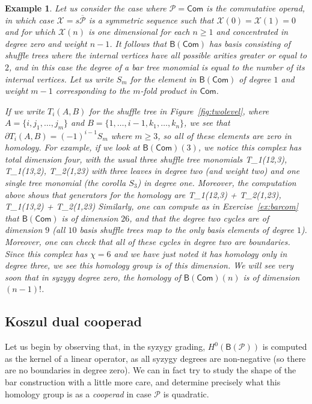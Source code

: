 \documentclass[fleqn, a4paper, twoside]{article}
\makeatletter
\newcommand{\0}{\langle 0\rangle}
\newcommand{\XX}{\mathcal{X}}
\newcommand{\B}[1]{\mathsf{B}(#1)}
\let\[\@undefined
\DeclareRobustCommand{\[}{\begin{equation}}%
\let\]\@undefined
\DeclareRobustCommand{\]}{\end{equation}}%
\theoremstyle{mytheorem}
\theoremstyle{introthm}
\theoremstyle{mydefinition}
\newtheorem{example}[theorem]{Example}
\theoremstyle{mydefinition2}
\theoremstyle{plain} %
\newcommand{\Com}{\mathsf{Com}}
\newcommand{\?}{\,?\,}
\newcommand{\PP}{{\mathcal{P}}}
\theoremstyle{mytheorem}
\theoremstyle{plain} %
\makeatother
\begin{document}
\begin{example} Let us consider the case where $\PP = \Com$ is the
commutative operad, in which case $\XX = s\overline{\PP}$ is a symmetric
sequence such that $\XX(0) = \XX(1) = 0$ and for which $\XX(n)$ is
one dimensional for each $n\geqslant 1$ and concentrated in
degree zero and weight $n-1$. It follows that $\B{\Com}$ has basis consisting
of shuffle trees where the internal vertices have
all possible arities greater or equal to $2$, and in this case the
degree of a bar tree monomial is equal to the number of 
its internal vertices. Let us write $S_m$ for the element in
$\B{\Com}$ of degree $1$ and weight $m-1$ corresponding to the 
$m$-fold product in $\Com$.

If we write $T_i(A,B)$ for the shuffle tree in
Figure~\ref{fig:twolevel}, where $A = \{ i,j_1,\ldots,j_m\}$
and $B = \{1,\ldots,i-1,k_1,\ldots,k_n\}$, we see that
$\partial T_i(A,B) = (-1)^{i-1} S_m$ where $m\geqslant 3$,
so all of these elements are zero in homology. For example, if
we look at $\B{\Com}(3)$, we notice this complex has total 
dimension four, with the usual three shuffle tree monomials
\[ T_1(12,3), 
	\quad
		T_1(13,2),
			\quad
		 	\quad T_2(1,23)
			\]
with three leaves in degree two (and weight two) and
one single tree monomial (the corolla $S_3$) in degree one.
Moreover, the computation above shows that generators for
the homology are
\[ 
T_1(12,3) + T_2(1,23),\qquad 
T_1(13,2) + T_2(1,23)
\]
Similarly, one can compute as in Exercise~\ref{ex:barcom} that
$\B{\Com}$ is of dimension $26$, and that the degree two cycles
are of dimension $9$ (all $10$ basis shuffle trees map to the only basis
elements of degree $1$). Moreover, one can check that all of these
cycles in degree two are boundaries. Since this complex has
$\chi = 6$ and we have just noted it has homology only in
degree three, we see this homology group is of this 
dimension. We will
see very soon that in
syzygy degree zero, the homology of $\B{\Com}(n)$ 
is of dimension $(n-1)!$.
\end{example}

\subsection{Koszul dual cooperad}

Let us begin by observing that, in the syzygy grading,
$H^0(\B{\PP})$ is computed as the kernel of a linear operator,
as all syzygy degrees are non-negative (so there are no boundaries
in degree zero). We can in fact try to study the shape of the bar
construction with a little more care, and determine precisely
what this homology group is as a \emph{cooperad} in case
$\PP$ is quadratic.
\end{document}
